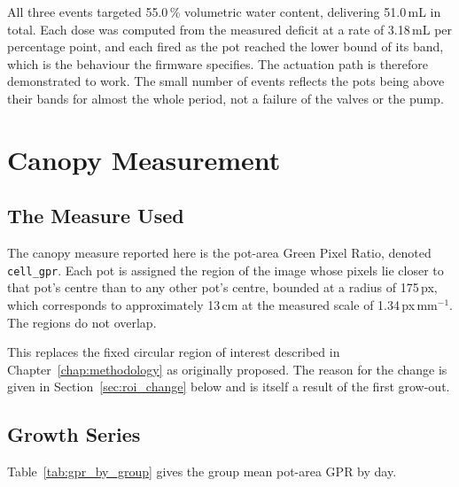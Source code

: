 All three events targeted 55.0\,\% volumetric water content, delivering
51.0\,mL in total. Each dose was computed from the measured deficit at a rate
of 3.18\,mL per percentage point, and each fired as the pot reached the lower
bound of its band, which is the behaviour the firmware specifies. The
actuation path is therefore demonstrated to work. The small number of events
reflects the pots being above their bands for almost the whole period, not a
failure of the valves or the pump.

\section{Canopy Measurement}

\subsection{The Measure Used}

The canopy measure reported here is the pot-area Green Pixel Ratio, denoted
\texttt{cell\_gpr}. Each pot is assigned the region of the image whose pixels
lie closer to that pot's centre than to any other pot's centre, bounded at a
radius of 175\,px, which corresponds to approximately 13\,cm at the measured
scale of 1.34\,px\,mm$^{-1}$. The regions do not overlap.

This replaces the fixed circular region of interest described in
Chapter~\ref{chap:methodology} as originally proposed. The reason for the
change is given in Section~\ref{sec:roi_change} below and is itself a result
of the first grow-out.

\subsection{Growth Series}

Table~\ref{tab:gpr_by_group} gives the group mean pot-area GPR by day.

